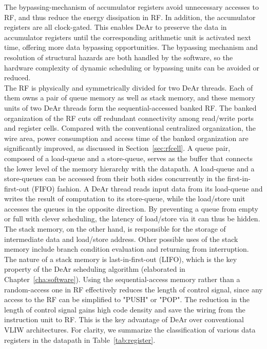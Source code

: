 The bypassing-mechanism of accumulator registers avoid unnecessary accesses to RF, 
and thus reduce the energy dissipation in RF.
In addition, the accumulator registers are all clock-gated.
This enables DeAr to preserve the data in accumulator registers until the corresponding arithmetic unit is activated next time, 
offering more data bypassing opportunities.
The bypassing mechanism and resolution of structural hazards are both handled by the software, 
so the hardware complexity of dynamic scheduling or bypassing units can be avoided or reduced.
\\\indent
The RF is physically and symmetrically divided for two DeAr threads.
Each of them owns a pair of queue memory as well as stack memory, 
and these memory units of two DeAr threads form the sequential-accessed banked RF.
The banked organization of the RF cuts off redundant connectivity among read/write ports and register cells.
Compared with the conventional centralized organization, 
the wire area, power consumption and access time of the banked organization are significantly improved, as discussed in Section~\ref{sec:rfcell}.
A queue pair, composed of a load-queue and a store-queue, 
serves as the buffer that connects the lower level of the memory hierarchy with the datapath.
A load-queue and a store-queues can be accessed from their both sides concurrently in the first-in-first-out (FIFO) fashion.
A DeAr thread reads input data from its load-queue and writes the result of computation to its store-queue, 
while the load/store unit accesses the queues in the opposite direction.
By preventing a queue from empty or full with clever scheduling, the latency of load/store via it can thus be hidden.
The stack memory, on the other hand, is responsible for the storage of intermediate data and load/store address.
Other possible uses of the stack memory include branch condition evaluation and returning from interruption.
The nature of a stack memory is last-in-first-out (LIFO), 
which is the key property of the DeAr scheduling algorithm (elaborated in Chapter~\ref{cha:software}).
Using the sequential-access memory rather than a random-access one in RF effectively reduces the length of control signal, 
since any access to the RF can be simplified to "PUSH" or "POP".
The reduction in the length of control signal gains high code density and save the wiring from the instruction unit to RF.
This is the key advantage of DeAr over conventional VLIW architectures.
For clarity, we summarize the classification of various data registers in the datapath in Table~\ref{tab:register}.
